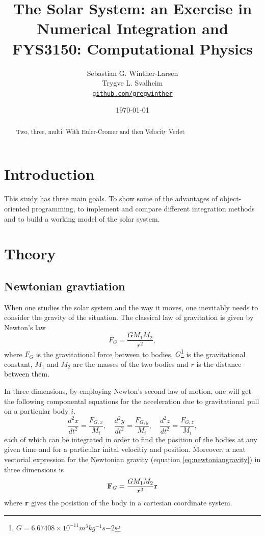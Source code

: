 \documentclass[10pt,a4paper]{amsart}
\title[Simulation of the Solar System]{The Solar System: an Exercise in Numerical Integration and \\
  \hrulefill\small{ FYS3150: Computational Physics }\hrulefill}
\author[Winther-Larsen \& Svalheim]{Sebastian G. Winther-Larsen \\ 
Trygve L. Svalheim \\
\href{https://github.com/gregwinther/FYS3150/}{\texttt{github.com/gregwinther}}}
\date{\today}
\begin{document}
\begin{titlepage}
\begin{abstract}
Two, three, multi. With Euler-Cromer and then Velocity Verlet
\end{abstract}
\maketitle
\tableofcontents
\end{titlepage}

\section{Introduction}

This study has three main goals. To show some of the advantages of object-oriented programming, to implement and compare different integration methods and to build a working model of the solar system. 

\section{Theory}

\subsection{Newtonian gravtiation}
When one studies the solar system and the way it moves, one inevitably needs to consider the gravity of the situation. The classical law of gravitation is given by Newton's law
\begin{equation}
\label{eq:newtoniangravity}
F_G = \frac{GM_1M_2}{r^2},
\end{equation} 
where $F_G$ is the gravitational force between to bodies, $G$\footnote{$G=6.67408 \times 10^{-11} m^3 kg^{-1} s{-2}$} is the gravitational constant, $M_1$ and $M_2$ are the masses of the two bodies and $r$ is the distance between them.

In three dimensions, by employing Newton's second law of motion, one will get the following componental equations for the acceleration due to gravitational pull on a particular body $i$.
\begin{equation}
\label{eq:componentalnewton}
\frac{d^2x}{dt^2} = \frac{F_{G,x}}{M_i}, \quad
\frac{d^2y}{dt^2} = \frac{F_{G,y}}{M_i}, \quad
\frac{d^2z}{dt^2} = \frac{F_{G,z}}{M_i},
\end{equation}
each of which can be integrated in order to find the position of the bodies at any given time and for a particular inital velocitiy and position. Moreover, a neat vectorial expression for the Newtonian gravity (equation \ref{eq:newtoniangravity}) in three dimensions is
\begin{equation}
\vb{F}_G = \frac{GM_1M_2}{r^3}\vb{r}
\end{equation}
where $\vb{r}$ gives the posistion of the body in a cartesian coordinate system.
\end{document}
